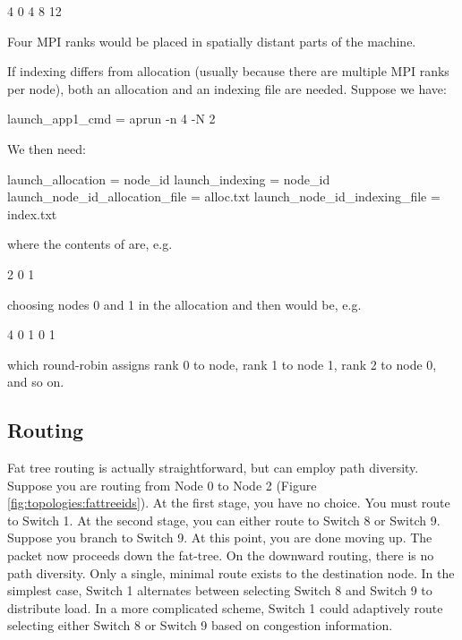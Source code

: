 \begin{ViFile}
4
0
4
8
12
\end{ViFile}
Four MPI ranks would be placed in spatially distant parts of the machine.

If indexing differs from allocation (usually because there are multiple MPI ranks per node), both an allocation and an indexing file are needed.
Suppose we have:

\begin{ViFile}
launch_app1_cmd = aprun -n 4 -N 2
\end{ViFile}
We then need:

\begin{ViFile}
launch_allocation = node_id
launch_indexing = node_id
launch_node_id_allocation_file = alloc.txt
launch_node_id_indexing_file = index.txt
\end{ViFile}
where the contents of  are, e.g.

\begin{ViFile}
2
0
1
\end{ViFile}
choosing nodes 0 and 1 in the allocation and then  would be, e.g.

\begin{ViFile}
4
0
1
0
1
\end{ViFile}
which round-robin assigns rank 0 to node, rank 1 to node 1, rank 2 to node 0, and so on.

\subsection{Routing}
Fat tree routing is actually straightforward, but can employ path diversity.
Suppose you are routing from Node 0 to Node 2 (Figure \ref{fig:topologies:fattreeids}).
At the first stage, you have no choice.
You must route to Switch 1.
At the second stage, you can either route to Switch 8 or Switch 9.
Suppose you branch to Switch 9. 
At this point, you are done moving up.
The packet now proceeds down the fat-tree.
On the downward routing, there is no path diversity.
Only a single, minimal route exists to the destination node.
In the simplest case, Switch 1 alternates between selecting Switch 8 and Switch 9 to distribute load.
In a more complicated scheme, Switch 1 could adaptively route selecting either Switch 8 or Switch 9 based on congestion information.
